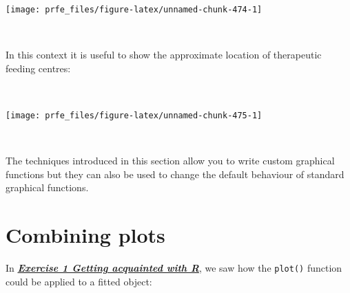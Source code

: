 \documentclass[12pt,a4paper]{book}
\newenvironment{Shaded}{\begin{snugshade}}{\end{snugshade}}
\newcommand{\DataTypeTok}[1]{\textcolor[rgb]{0.13,0.29,0.53}{#1}}
\newcommand{\DecValTok}[1]{\textcolor[rgb]{0.00,0.00,0.81}{#1}}
\newcommand{\FloatTok}[1]{\textcolor[rgb]{0.00,0.00,0.81}{#1}}
\newcommand{\KeywordTok}[1]{\textcolor[rgb]{0.13,0.29,0.53}{\textbf{#1}}}
\newcommand{\NormalTok}[1]{#1}
\newcommand{\OperatorTok}[1]{\textcolor[rgb]{0.81,0.36,0.00}{\textbf{#1}}}
\newcommand{\OtherTok}[1]{\textcolor[rgb]{0.56,0.35,0.01}{#1}}
\newcommand{\StringTok}[1]{\textcolor[rgb]{0.31,0.60,0.02}{#1}}
\theoremstyle{definition}
\theoremstyle{definition}
\theoremstyle{definition}
\theoremstyle{remark}
\begin{document}
\begin{center}\texttt{[image: prfe\_files/figure-latex/unnamed-chunk-474-1]} \end{center}

~

In this context it is useful to show the approximate location of
therapeutic feeding centres:

~

\begin{Shaded}
\end{Shaded}

\begin{center}\texttt{[image: prfe\_files/figure-latex/unnamed-chunk-475-1]} \end{center}

~

The techniques introduced in this section allow you to write custom
graphical functions but they can also be used to change the default
behaviour of standard graphical functions.

\hypertarget{combining-plots}{%
\section{Combining plots}\label{combining-plots}}

In \protect\hyperlink{exercise1}{\textbf{\emph{Exercise 1 Getting
acquainted with R}}}, we saw how the \texttt{plot()} function could be
applied to a fitted object:
\end{document}
